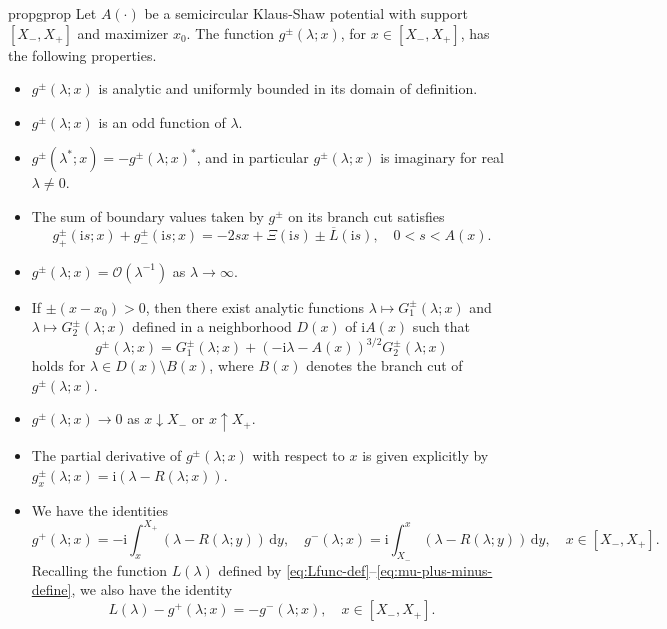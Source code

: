 \documentclass[12pt]{amsart}
\numberwithin{equation}{section}
\newcommand{\dd}{\mathrm{d}}
\newcommand{\ii}{\mathrm{i}}
\newcommand{\SP}{\lambda}
\newcommand{\tailint}{\Xi}
\newcommand{\bigo}[1]{ \mathcal{O}\! \left( #1 \right) }
\begin{document}
\begin{restatable}{prop}{gprop}
Let $A(\cdot)$ be a semicircular Klaus-Shaw potential with support $[X_-,X_+]$ and maximizer $x_0$.  The function $g^\pm(\SP;x)$, for $x \in [X_-,X_+]$, has the following properties.  
\begin{itemize}
\item[G1:] $g^\pm(\SP;x)$ is analytic and uniformly bounded in its domain of definition.  
\item[G2:] $g^\pm(\SP;x)$ is an odd function of $\SP$.  
\item[G3:] $g^\pm(\SP^*;x)=-g^\pm(\SP;x)^*$, and in particular $g^\pm(\SP;x)$ is imaginary for real $\SP\neq 0$.
\item[G4:] The sum of boundary values taken by $g^\pm$ on its branch cut satisfies
\begin{equation}
g_+^\pm(\ii s;x)+g_-^\pm(\ii s;x)=-2sx + \tailint(\ii s)\pm\overline{L}(\ii s),\quad 0<s<A(x).
\label{eq:g-zeta-plus-minus}
\end{equation}
\item[G5:] $g^\pm(\SP;x)=\bigo{\SP^{-1}}$ as $\SP \to \infty$.
\item[G6:] 
If $\pm(x-x_0)>0$, then there exist analytic functions $\SP\mapsto G^\pm_1(\SP;x)$ and $\SP\mapsto G^\pm_2(\SP;x)$ defined in a neighborhood $D(x)$ of $\ii A(x)$ such that 
\begin{equation}
g^\pm(\SP;x)=G_1^\pm(\SP;x)+(-\ii\SP-A(x))^{3/2}G_2^\pm(\SP;x)
\end{equation}
holds for $\SP\in D(x)\setminus B(x)$, where $B(x)$ denotes the branch cut of $g^\pm(\SP;x)$.  
\item[G7:] $g^\pm(\SP;x)\to 0$ as $x\downarrow X_-$ or $x\uparrow X_+$.  
\item[G8:] The partial derivative of $g^\pm(\SP;x)$ with respect to $x$ is given explicitly by $g^\pm_x(\SP;x)=\ii(\SP-R(\SP;x))$.  
\item[G9:] We have the identities
\begin{equation} 
g^+(\SP;x)=-\ii\int_x^{X_+}(\SP-R(\SP;y))\,\dd y,\quad
g^-(\SP;x)=\ii\int_{X_-}^x(\SP-R(\SP;y))\,\dd y,\quad x\in [X_-,X_+].
\label{eq:gplus-gminus-x-integral}
\end{equation}
Recalling the function $L(\SP)$ defined by \eqref{eq:Lfunc-def}--\eqref{eq:mu-plus-minus-define}, we also have the identity
\begin{equation}
L(\SP)-g^+(\SP;x)=-g^-(\SP;x),\quad x\in [X_-,X_+].
\label{eq:gplus-gminus-L-identity}
\end{equation}
\end{itemize}
\label{prop:g-properties}
\end{restatable}
\end{document}
